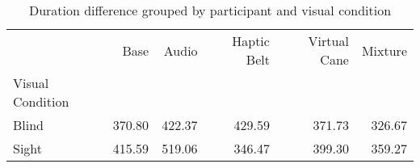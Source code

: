
\begin{table}[!htb]
\centering
\caption{Duration difference grouped by participant and visual condition}
\label{tab:duracao_average_group}
\begin{tabular}{lrrrrr}
\toprule
{} &    Base &   Audio & Haptic Belt & Virtual Cane & Mixture \\
Visual Condition &         &         &             &              &         \\
\midrule
Blind            &  370.80 &  422.37 &      429.59 &       371.73 &  326.67 \\
Sight            &  415.59 &  519.06 &      346.47 &       399.30 &  359.27 \\
\bottomrule
\end{tabular}
\end{table}

